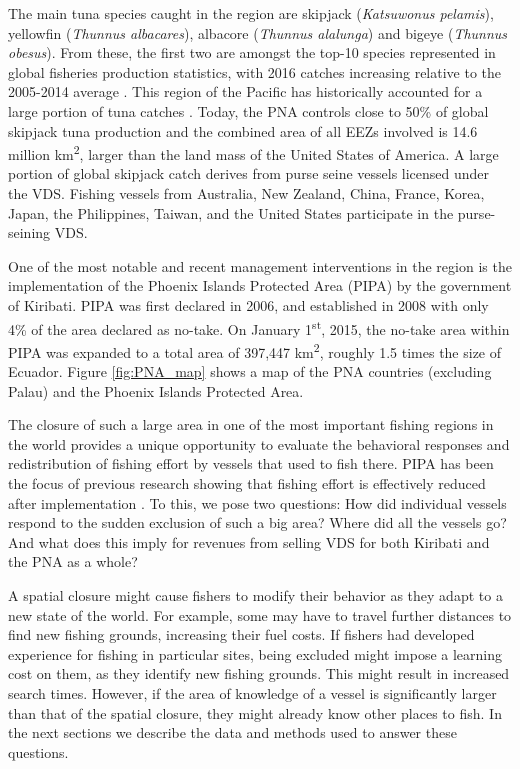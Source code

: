 \documentclass[9pttwoside,lineno]{pnas-new}
\begin{document}
The main tuna species caught in the region are skipjack
(\emph{Katsuwonus pelamis}), yellowfin (\emph{Thunnus albacares}),
albacore (\emph{Thunnus alalunga}) and bigeye (\emph{Thunnus obesus}).
From these, the first two are amongst the top-10 species represented in
global fisheries production statistics, with 2016 catches increasing
relative to the 2005-2014 average \citep{fao_2018}. This region of the
Pacific has historically accounted for a large portion of tuna catches
\cite{aqorau_1997}. Today, the PNA controls close to 50\% of global
skipjack tuna production \cite{pna_website_2018} and the combined area of all EEZs involved is 14.6 million km\textsuperscript{2}, larger than the land mass of the United States of America. A large portion of global skipjack
catch derives from purse seine vessels licensed under the VDS.
Fishing vessels from Australia, New Zealand, China, France, Korea,
Japan, the Philippines, Taiwan, and the United States participate in the
purse-seining VDS.

One of the most notable and recent management interventions in the
region is the implementation of the Phoenix Islands Protected Area (PIPA)
by the government of Kiribati. PIPA was first declared in 2006, and
established in 2008 with only 4\% of the area declared as no-take. On
January 1\textsuperscript{st}, 2015, the no-take area within PIPA was
expanded to a total area of 397,447 km\textsuperscript{2}, roughly 1.5
times the size of Ecuador. Figure \ref{fig:PNA_map} shows a map of the
PNA countries (excluding Palau) and the Phoenix Islands Protected Area.

The closure of such a large area in one of the most important fishing
regions in the world provides a unique opportunity to evaluate the
behavioral responses and redistribution of fishing effort by vessels
that used to fish there. PIPA has been the focus of previous research
showing that fishing effort is effectively reduced after implementation
\citep{mccauley_2016,mcdermott_2018}. To this, we pose two questions:
How did individual vessels respond to the sudden exclusion of such a big
area? Where did all the vessels go? And what does this imply for revenues from
selling VDS for both Kiribati and the PNA as a whole? 

A spatial closure might cause fishers to modify
their behavior as they adapt to a new state of the world. For example, some may have
to travel further distances to find new fishing grounds, increasing their fuel
costs. If fishers had developed experience for fishing in particular
sites, being excluded might impose a learning cost on them, as they
identify new fishing grounds. This might result in increased search
times. However, if the area of knowledge of a vessel is significantly
larger than that of the spatial closure, they might already know other
places to fish. In the next sections we describe
the data and methods used to answer these questions.
\end{document}

